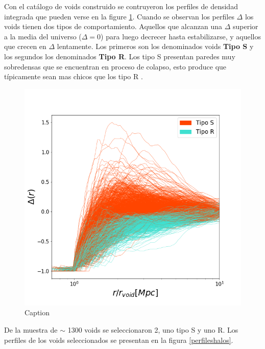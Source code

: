Con el cat\'alogo de voids construido se contruyeron los perfiles de densidad integrada que pueden verse en la figure \ref{PerfilesVoids}. Cuando se observan los perfiles $\Delta$ los voids tienen dos tipos de comportamiento. Aquellos que alcanzan una $\Delta$ superior a la media del universo ($\Delta=0$) para luego decrecer hasta estabilizarse, y aquellos que crecen en $\Delta$ lentamente. Los primeros son los denominados voids \textbf{Tipo S} y los segundos los denominados \textbf{Tipo R}. Los tipo S presentan paredes muy sobredensas que se encuentran en proceso de colapso, esto produce que t\'ipicamente sean mas chicos que los tipo R \citep{Ceccarelli2013}.
\begin{figure}
    \centering
    \includegraphics[width=12cm]{Figures/voids_sep.png}
    \caption{Caption}
    \label{PerfilesVoids}
\end{figure}{}

De la muestra de $\sim$ 1300 voids se seleccionaron 2, uno tipo S y uno R. Los perfiles de los voids seleccionados se presentan en la figura \ref{perfileshalos}. 

